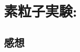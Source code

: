 \documentclass[../../sp_2014.tex]{subfiles}
\begin{document}
\section{素粒子実験:}


\subsection*{感想}
\end{document}

